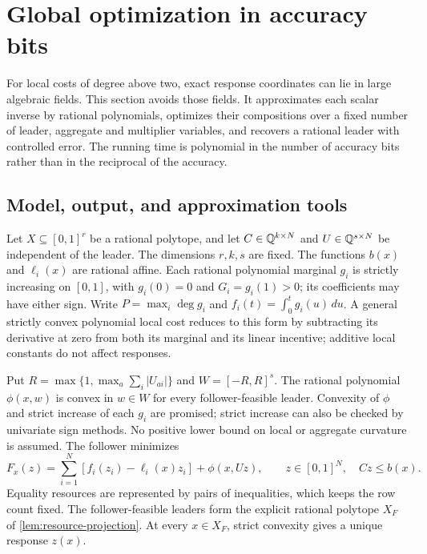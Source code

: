 \section{Global optimization in accuracy bits}\label{sec:accuracy}

For local costs of degree above two, exact response coordinates can
lie in large algebraic fields. This section avoids those fields. It
approximates each scalar inverse by rational polynomials, optimizes
their compositions over a fixed number of leader, aggregate and
multiplier variables, and recovers a rational leader with controlled
error. The running time is polynomial in the number of accuracy bits
rather than in the reciprocal of the accuracy.

\subsection{Model, output, and approximation tools}\label{subsec:accuracy-model}

Let $X\subseteq[0,1]^r$ be a rational polytope, and let
$C\in\mathbb Q^{k\times N}$ and $U\in\mathbb Q^{s\times N}$ be independent of
the leader. The dimensions $r,k,s$ are fixed. The functions $b(x)$
and $\ell_i(x)$ are rational affine. Each rational polynomial marginal
$g_i$ is strictly increasing on $[0,1]$, with $g_i(0)=0$ and
$G_i=g_i(1)>0$; its coefficients may have either sign. Write
$P=\max_i\deg g_i$ and $f_i(t)=\int_0^t g_i(u)\,du$.
A general strictly convex polynomial local cost reduces to this form
by subtracting its derivative at zero from both its marginal and its
linear incentive; additive local constants do not affect responses.

Put $R=\max\{1,\max_a\sum_i|U_{ai}|\}$ and
$W=[-R,R]^s$. The rational polynomial $\phi(x,w)$ is convex in
$w\in W$ for every follower-feasible leader. Convexity of $\phi$ and
strict increase of each $g_i$ are promised; strict increase can also be
checked by univariate sign methods. No positive lower bound on local or
aggregate curvature is assumed. The follower minimizes
\begin{equation}\label{eq:accuracy-follower}
 F_x(z)=\sum_{i=1}^N[f_i(z_i)-\ell_i(x)z_i]+\phi(x,Uz),
 \qquad z\in[0,1]^N,\quad Cz\le b(x).
\end{equation}
Equality resources are represented by pairs of inequalities, which
keeps the row count fixed. The follower-feasible leaders form the
explicit rational polytope $X_F$ of \cref{lem:resource-projection}.
At every $x\in X_F$, strict convexity gives a unique response $z(x)$.

